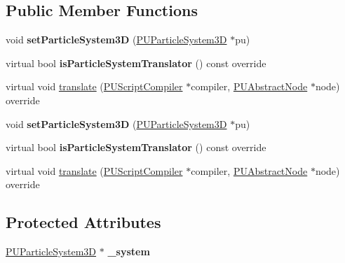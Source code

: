 \subsection*{Public Member Functions}
\begin{DoxyCompactItemize}
\item 
\mbox{\label{classPUParticleSystem3DTranslator_ad88522eb8338f5b76b653df4a7edbc71}} 
void {\bfseries set\+Particle\+System3D} (\hyperlink{classPUParticleSystem3D}{P\+U\+Particle\+System3D} $\ast$pu)
\item 
\mbox{\label{classPUParticleSystem3DTranslator_a0f4c6ee9bc83c5fbffcbaccaaa40dec4}} 
virtual bool {\bfseries is\+Particle\+System\+Translator} () const override
\item 
virtual void \hyperlink{classPUParticleSystem3DTranslator_a3ae0aae9a330ba95015c3bea96e8e642}{translate} (\hyperlink{classPUScriptCompiler}{P\+U\+Script\+Compiler} $\ast$compiler, \hyperlink{classPUAbstractNode}{P\+U\+Abstract\+Node} $\ast$node) override
\item 
\mbox{\label{classPUParticleSystem3DTranslator_ad88522eb8338f5b76b653df4a7edbc71}} 
void {\bfseries set\+Particle\+System3D} (\hyperlink{classPUParticleSystem3D}{P\+U\+Particle\+System3D} $\ast$pu)
\item 
\mbox{\label{classPUParticleSystem3DTranslator_a0f4c6ee9bc83c5fbffcbaccaaa40dec4}} 
virtual bool {\bfseries is\+Particle\+System\+Translator} () const override
\item 
virtual void \hyperlink{classPUParticleSystem3DTranslator_a9143639c923068f0d52ad0cd5befd3aa}{translate} (\hyperlink{classPUScriptCompiler}{P\+U\+Script\+Compiler} $\ast$compiler, \hyperlink{classPUAbstractNode}{P\+U\+Abstract\+Node} $\ast$node) override
\end{DoxyCompactItemize}
\subsection*{Protected Attributes}
\begin{DoxyCompactItemize}
\item 
\mbox{\label{classPUParticleSystem3DTranslator_a55f8b6df45048e646cc9d3419989adff}} 
\hyperlink{classPUParticleSystem3D}{P\+U\+Particle\+System3D} $\ast$ {\bfseries \+\_\+system}
\end{DoxyCompactItemize}
